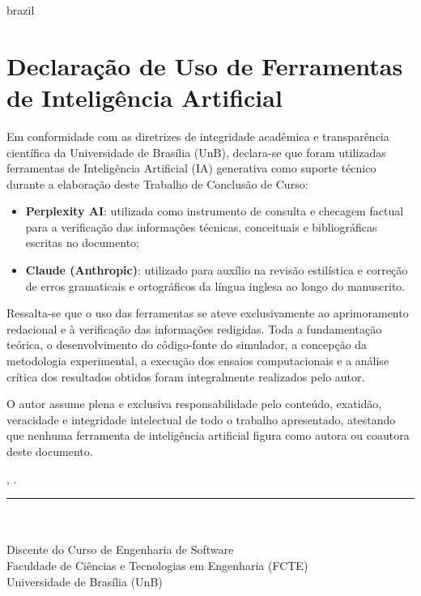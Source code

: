 \begin{apendicesenv}
\begin{otherlanguage*}{brazil}

\chapter{Declaração de Uso de Ferramentas de Inteligência Artificial}
\label{apendice:declaracao_ia}

Em conformidade com as diretrizes de integridade acadêmica e transparência científica da Universidade de Brasília (UnB), declara-se que foram utilizadas ferramentas de Inteligência Artificial (IA) generativa como suporte técnico durante a elaboração deste Trabalho de Conclusão de Curso:

\begin{itemize}
    \item \textbf{Perplexity AI}: utilizada como instrumento de consulta e checagem factual para a verificação das informações técnicas, conceituais e bibliográficas escritas no documento;
    \item \textbf{Claude (Anthropic)}: utilizado para auxílio na revisão estilística e correção de erros gramaticais e ortográficos da língua inglesa ao longo do manuscrito.
\end{itemize}

Ressalta-se que o uso das ferramentas se ateve exclusivamente ao aprimoramento redacional e à verificação das informações redigidas. Toda a fundamentação teórica, o desenvolvimento do código-fonte do simulador, a concepção da metodologia experimental, a execução dos ensaios computacionais e a análise crítica dos resultados obtidos foram integralmente realizados pelo autor.

O autor assume plena e exclusiva responsabilidade pelo conteúdo, exatidão, veracidade e integridade intelectual de todo o trabalho apresentado, atestando que nenhuma ferramenta de inteligência artificial figura como autora ou coautora deste documento.

\vspace{1.5cm}

\begin{center}
    \imprimirlocal, \imprimirdata.

    \vspace{1.5cm}

    \begin{minipage}{0.65\textwidth}
        \centering
        \rule{\textwidth}{0.5pt} \\
        \textbf{\imprimirautor} \\
        Discente do Curso de Engenharia de Software \\
        Faculdade de Ciências e Tecnologias em Engenharia (FCTE) \\
        Universidade de Brasília (UnB)
    \end{minipage}
\end{center}

\end{otherlanguage*}
\end{apendicesenv}

